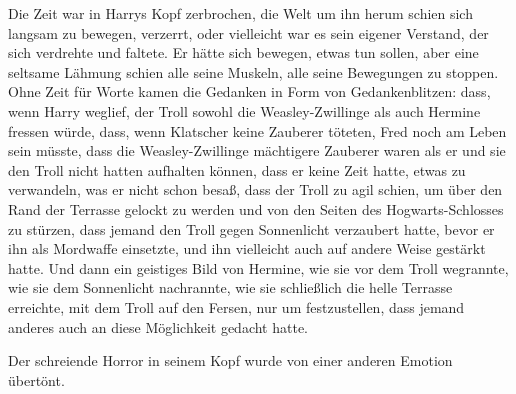 Die Zeit war in Harrys Kopf zerbrochen, die Welt um ihn herum schien sich langsam zu bewegen, verzerrt, oder vielleicht war es sein eigener Verstand, der sich verdrehte und faltete. Er hätte sich bewegen, etwas tun sollen, aber eine seltsame Lähmung schien alle seine Muskeln, alle seine Bewegungen zu stoppen. Ohne Zeit für Worte kamen die Gedanken in Form von Gedankenblitzen: dass, wenn Harry weglief, der Troll sowohl die Weasley-Zwillinge als auch Hermine fressen würde, dass, wenn Klatscher keine Zauberer töteten, Fred noch am Leben sein müsste, dass die Weasley-Zwillinge mächtigere Zauberer waren als er und sie den Troll nicht hatten aufhalten können, dass er keine Zeit hatte, etwas zu verwandeln, was er nicht schon besaß, dass der Troll zu agil schien, um über den Rand der Terrasse gelockt zu werden und von den Seiten des Hogwarts-Schlosses zu stürzen, dass jemand den Troll gegen Sonnenlicht verzaubert hatte, bevor er ihn als Mordwaffe einsetzte, und ihn vielleicht auch auf andere Weise gestärkt hatte.
Und dann ein geistiges Bild von Hermine, wie sie vor dem Troll wegrannte, wie sie dem Sonnenlicht nachrannte, wie sie schließlich die helle Terrasse erreichte, mit dem Troll auf den Fersen, nur um festzustellen, dass jemand anderes auch an diese Möglichkeit gedacht hatte.

Der schreiende Horror in seinem Kopf wurde von einer anderen Emotion übertönt.

